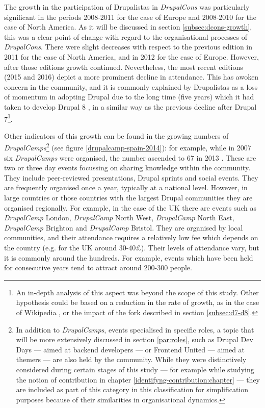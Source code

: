 The growth in the participation of Drupalistas in \textit{DrupalCons} was particularly significant in the periods 2008-2011 for the case of Europe and 2008-2010 for the case of North America. As it will be discussed in section \ref{subsec:dcons-growth}, this was a clear point of change with regard to the organisational processes of \textit{DrupalCons}. There were slight decreases with respect to the previous edition in 2011 for the case of North America, and in 2012 for the case of Europe. However, after those editions growth continued. Nevertheless, the most recent editions (2015 and 2016) depict a more prominent decline in attendance. This has awoken concern in the community, and it is commonly explained by Drupalistas as a loss of momentum in adopting Drupal due to the long time (five years) which it had taken to develop Drupal 8 \parencite{drupal-momentum:2016:Online}, in a similar way as the previous decline after Drupal 7\footnote{An in-depth analysis of this aspect was beyond the scope of this study. Other hypothesis could be based on a reduction in the rate of growth, as in the case of Wikipedia \parencite{suh2009singularity}, or the impact of the fork described in section \ref{subsec:d7-d8}.}.

Other indicators of this growth can be found in the growing numbers of \textit{DrupalCamps}\footnote{\label{fn-dev-days}In addition to \textit{DrupalCamps}, events specialised in specific roles, a topic that will be more extensively discussed in section \ref{par:roles},  such as Drupal Dev Days --- aimed at backend developers --- or Frontend United --- aimed at themers --- are also held by the community. While they were distinctively considered during certain stages of this study --- for example while studying the notion of contribution in chapter \ref{identifyng-contribution:chapter} --- they are included as part of this category in this classification for simplification purposes because of their similarities in organisational dynamics.} (see figure \ref{drupalcamp-spain-2014}): for example, while in 2007 six \textit{DrupalCamps} were organised, the number ascended to 67 in 2013 \parencite{ostraining-list-drupalcamps:2016:Online}. These are two or three day events focussing on sharing knowledge within the community. They include peer-reviewed  presentations, Drupal sprints and social events. They are frequently organised once a year, typically at a national level. However, in large countries or those countries with the largest Drupal communities they are organised regionally. For example, in the case of the UK there are events such as \textit{DrupalCamp} London, \textit{DrupalCamp} North West, \textit{DrupalCamp} North East, \textit{DrupalCamp} Brighton and \textit{DrupalCamp} Bristol. They are organised by local communities, and their attendance requires a relatively low fee which depends on the country (e.g. for the UK around 30-40\pounds). Their levels of attendance vary, but it is commonly around the hundreds. For example, events which have been held for consecutive years tend to attract around 200-300 people.

